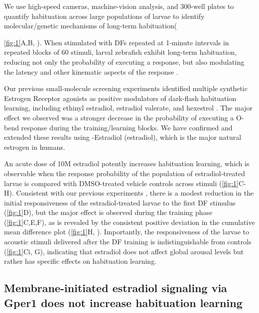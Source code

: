 \documentclass[9pt,lineno]{RandlettLab_elife}
\begin{document}
We use high-speed cameras, machine-vision analysis, and 300-well plates to quantify habituation across large populations of larvae to identify molecular/genetic mechanisms of long-term habituation({\autoref{fig:1}A,B, \citealp{Randlett2019-fj,Lamire2023-he}). 
When stimulated with DFs repeated at 1-minute intervals in repeated blocks of 60 stimuli, larval zebrafish exhibit long-term habituation, reducing not only the probability of executing a response, but also modulating the latency and other kinematic aspects of the response \citep{Randlett2019-fj}.  


Our previous small-molecule screening experiments identified multiple synthetic Estrogen Receptor agonists as positive modulators of dark-flash habituation learning, including ethinyl estradiol, estradiol valerate, and hexestrol  \citep{Lamire2023-he}. 
The major effect we observed was a stronger decrease in the probability of executing a O-bend response during the training/learning blocks. 
We have confirmed and extended these results using \textbeta-Estradiol (estradiol), which is the major natural estrogen in humans. 



An acute dose of 10\textmu M estradiol potently increases habituation learning, which is observable when the response probability of the population of estradiol-treated larvae is compared with DMSO-treated vehicle controls across stimuli (\autoref{fig:1}C-H).
Consistent with our previous experiments \citep{Lamire2023-he}, there is a modest reduction in the initial responsiveness of the estradiol-treated larvae to the first DF stimulus (\autoref{fig:1}D), but the major effect is observed during the training phase (\autoref{fig:1}C,E,F), as is revealed by the consistent positive deviation in the cumulative mean difference plot (\autoref{fig:1}H, \citealp{Randlett2019-fj}).
Importantly, the responsiveness of the larvae to acoustic stimuli delivered after the DF training is indistinguishable from controls (\autoref{fig:1}Ci, G), indicating that estradiol does not affect global arousal levels but rather has specific effects on habituation learning. 



\subsection{Membrane-initiated estradiol signaling via Gper1 does not increase habituation learning}

}
\end{document}
